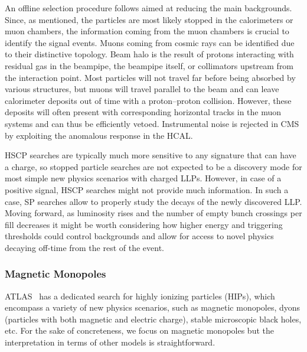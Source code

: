 An offline selection procedure follows aimed at reducing the main backgrounds. Since, as mentioned, the particles are most likely stopped in the calorimeters or muon chambers, the information coming from the muon chambers is crucial to identify the signal events. 
Muons coming from cosmic rays can be identified due to their distinctive topology. Beam halo is the result of protons interacting with residual gas in the beampipe, the beampipe itself, or collimators upstream from the interaction point. Most particles will not travel far before being absorbed by various structures, but muons will travel parallel to the beam and can leave calorimeter deposits out of time with a proton--proton collision. 
However, these deposits will often present with corresponding horizontal tracks in the muon systems and can thus be efficiently vetoed. Instrumental noise is rejected in CMS by exploiting the anomalous response in the HCAL. 

HSCP searches are typically much more sensitive to any signature that can have a charge, so stopped particle searches are not expected to be a discovery mode for most simple new physics scenarios with charged LLPs. However, in case of a positive signal, HSCP searches might not provide much information. In such a case, SP searches allow to properly study the decays of the newly discovered LLP. 
Moving forward, as luminosity rises and the number of empty bunch crossings per fill decreases it might be worth considering how higher energy and triggering thresholds could control backgrounds and allow for access to novel physics decaying off-time from the rest of the event. 

\subsubsection{Magnetic Monopoles} 

ATLAS~\cite{Aad:2015kta} has a dedicated search for highly ionizing particles (HIPs), which encompass a variety of new physics scenarios, such as magnetic monopoles, dyons (particles with both magnetic and electric charge), stable microscopic black holes, etc. For the sake of concreteness, we focus on magnetic monopoles but the interpretation in terms of other models is straightforward.

